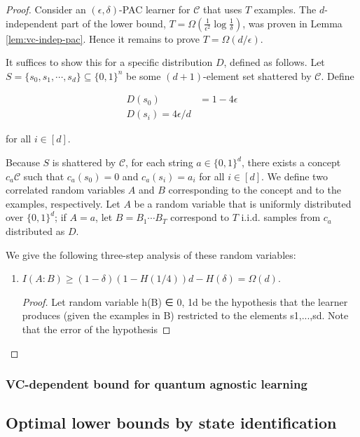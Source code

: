 \documentclass[main.tex]{subfiles}
\begin{document}
\begin{proof} 
Consider an $(\epsilon,\delta)$-PAC learner for $\mathcal{C}$ that uses $T$ examples. The $d$-independent part of the lower bound, $T = \Omega(\frac{1}{\epsilon^2}\log \frac{1}{\delta})$, was proven in Lemma \ref{lem:vc-indep-pac}. Hence it remains to prove $T = \Omega(d/\epsilon)$. 

It suffices to show this for a specific distribution $D$, defined as follows. Let $S = \{s_0,s_1,\cdots,s_d\} \subseteq \{0,1\}^n$ be some $(d + 1)$-element set shattered by $\mathcal{C}$. Define 

\begin{align}
D(s_0) &= 1-4\epsilon\\
D(s_i) = 4\epsilon/d 	
\end{align}

for all $i \in [d]$.

Because $S$ is shattered by $\mathcal{C}$, for each string $a \in \{0, 1\}^d$, there exists a concept $c_a \mathcal{C}$ such that $c_a(s_0) = 0$ and $c_a(s_i) = a_i$ for all $i \in [d]$. We define two correlated random variables $A$ and $B$ corresponding to the concept and to the examples, respectively. Let $A$ be a random variable that is uniformly distributed over $\{0, 1\}^d$; if $A = a$, let $B = B_1 \cdots B_T$ correspond to $T$ i.i.d. samples from $c_a$ distributed as $D$. 

We give the following three-step analysis of these random variables:

\begin{enumerate}
\item $I(A:B)\geq (1-\delta)(1-H(1/4))d−H(\delta)= \Omega(d)$.

\begin{proof}
 Let random variable h(B) ∈ {0, 1}d be the hypothesis that the learner produces (given
the examples in B) restricted to the elements s1,...,sd. Note that the error of the hypothesis
\end{proof}
\end{enumerate}


\end{proof}

\subsubsection{VC-dependent bound for quantum agnostic learning}

\subsection{Optimal lower bounds by state identification}
\end{document}
